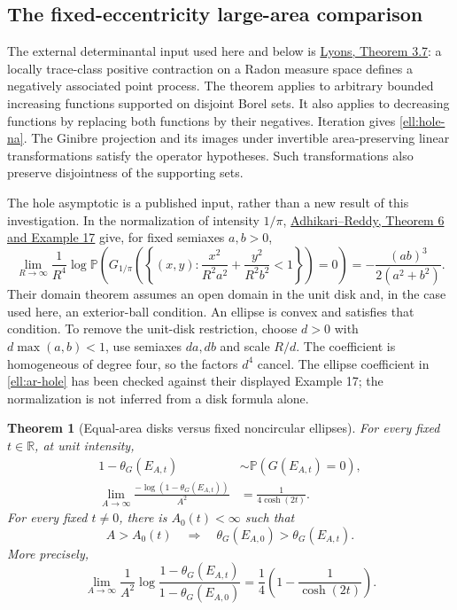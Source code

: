 \documentclass[11pt,a4paper]{article}
\newtheorem{theorem}{Theorem}
\theoremstyle{definition}
\theoremstyle{remark}
\numberwithin{equation}{section}
\begin{document}
\subsection{The fixed-eccentricity large-area comparison}

The external determinantal input used here and below is
\href{https://arxiv.org/html/1406.2707v1}{Lyons, Theorem 3.7}:
a locally trace-class positive contraction on a Radon measure space
defines a negatively associated point process.  The theorem applies
to arbitrary bounded increasing functions supported on disjoint
Borel sets.  It also applies to decreasing functions by replacing
both functions by their negatives.  Iteration gives
\eqref{ell:hole-na}.  The Ginibre projection and its images under
invertible area-preserving linear transformations satisfy the
operator hypotheses.  Such transformations also preserve
disjointness of the supporting sets.

The hole asymptotic is a published input, rather than a new result
of this investigation.  In the normalization of intensity $1/\pi$,
\href{https://arxiv.org/html/1604.08363v3}{Adhikari--Reddy,
Theorem 6 and Example 17} give, for fixed semiaxes $a,b>0$,
\begin{equation}\label{ell:ar-hole}
 \lim_{R\to\infty}\frac1{R^4}
 \log\mathbb P\left(G_{1/\pi}\left(
 \left\{(x,y):\frac{x^2}{R^2a^2}+\frac{y^2}{R^2b^2}<1\right\}
 \right)=0\right)
 =-\frac{(ab)^3}{2(a^2+b^2)}.
\end{equation}
Their domain theorem assumes an open domain in the unit disk and,
in the case used here, an exterior-ball condition.  An ellipse is
convex and satisfies that condition.  To remove the unit-disk
restriction, choose $d>0$ with $d\max(a,b)<1$, use semiaxes
$da,db$ and scale $R/d$.  The coefficient is homogeneous of
degree four, so the factors $d^4$ cancel.  The ellipse coefficient
in \eqref{ell:ar-hole} has been checked against their displayed
Example 17; the normalization is not inferred from a disk formula
alone.

\begin{theorem}[Equal-area disks versus fixed noncircular ellipses]
\label{ell:large-area}
For every fixed $t\in\mathbb R$, at unit intensity,
\begin{align}
 1-\theta_G(E_{A,t})
  &\sim \mathbb P(G(E_{A,t})=0),\label{ell:large-equivalence}\\
 \lim_{A\to\infty}\frac{-\log(1-\theta_G(E_{A,t}))}{A^2}
  &=\frac1{4\cosh(2t)}.\label{ell:large-rate}
\end{align}
For every fixed $t\ne0$, there is $A_0(t)<\infty$ such that
\begin{equation}\label{ell:large-strict}
 A>A_0(t)\quad\Longrightarrow\quad
 \theta_G(E_{A,0})>\theta_G(E_{A,t}).
\end{equation}
More precisely,
\begin{equation}\label{ell:failure-ratio}
 \lim_{A\to\infty}\frac1{A^2}
  \log\frac{1-\theta_G(E_{A,t})}{1-\theta_G(E_{A,0})}
 =\frac14\left(1-\frac1{\cosh(2t)}\right).
\end{equation}
\end{theorem}
\end{document}
